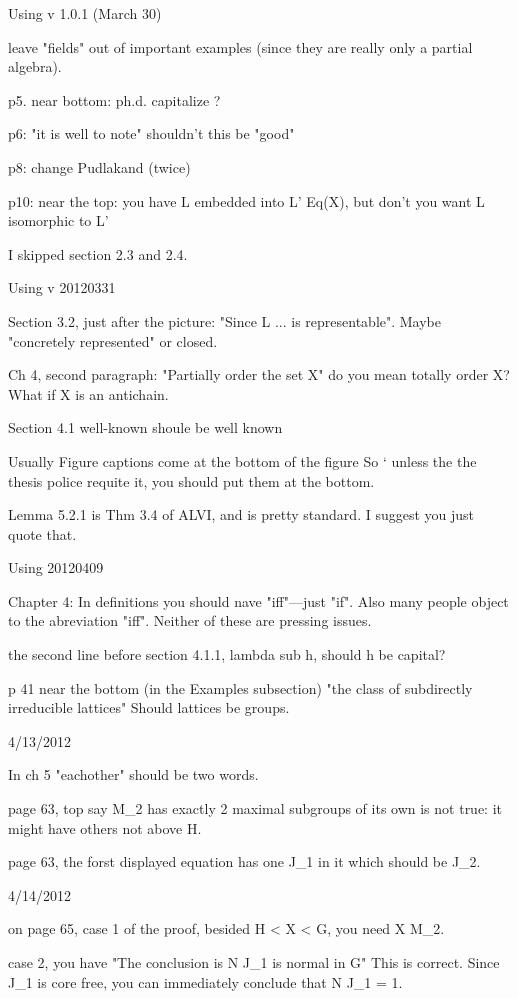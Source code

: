 
Using v 1.0.1 (March 30)

leave "fields" out of important examples (since they are really only
a partial algebra).

p5. near bottom: ph.d. capitalize ?

p6: "it is well to note" shouldn't this be "good"

p8: change Pudlakand (twice)

p10: near the top: you have L embedded into L' \le Eq(X), but don't
     you want L isomorphic to L'

I skipped section 2.3 and 2.4.

Using v 20120331

Section 3.2, just after the picture: "Since L ... is representable". Maybe
"concretely represented" or closed.

Ch 4, second paragraph: "Partially order the set X" do you mean totally
order X? What if X is an antichain.

Section 4.1 well-known shoule be well known

Usually Figure captions come at the bottom of the figure So `
unless the the thesis police requite it, you should put them at the bottom.

Lemma 5.2.1 is Thm 3.4 of ALVI, and is pretty standard. I suggest 
you just quote that.

Using 20120409

Chapter 4:
In definitions you should nave "iff"---just "if". Also many people 
object to the abreviation "iff". Neither of these are pressing issues.

the second line before section 4.1.1, lambda sub h, should h be capital?

p 41 near the bottom (in the Examples subsection) "the class
of subdirectly irreducible lattices" Should lattices be groups.

4/13/2012

In ch 5 "eachother" should be two words.

page 63, top say M_2 has exactly 2 maximal subgroups of its own is not true:
it might have others not above H.

page 63, the forst displayed equation has one J_1 in it which should be J_2.

4/14/2012

on page 65, case 1 of the proof, besided H < X < G, you need X \ne M_2.

  case 2, you have "The conclusion is N \cap J_1  is normal in G"
          This is correct. Since J_1 is core free, you can immediately 
          conclude that N \cap J_1 = 1.











